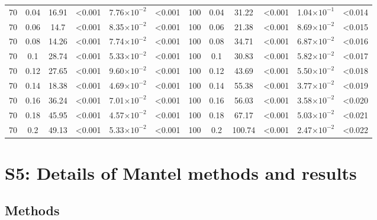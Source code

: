 \documentclass[12pt]{article}
\begin{document}
\begin{spacing}{2.0}
\begin{table}[hb!]
\begin{tabular}{c c | c c| c c ||c c | c c | c c |}
            70  & 0.04  & 16.91 & \textless0.001  & 7.76$\times10^{-2}$ & \textless0.001  & 100 & 0.04  & 31.22 & \textless0.001  & 1.04$\times10^{-1}$ & \textless0.014  \\
            70  & 0.06  & 14.7  & \textless0.001  & 8.35$\times10^{-2}$ & \textless0.001  & 100 & 0.06  & 21.38 & \textless0.001  & 8.69$\times10^{-2}$ & \textless0.015  \\
            70  & 0.08  & 14.26 & \textless0.001  & 7.74$\times10^{-2}$ & \textless0.001  & 100 & 0.08  & 34.71 & \textless0.001  & 6.87$\times10^{-2}$ & \textless0.016  \\
            70  & 0.1 & 28.74 & \textless0.001  & 5.33$\times10^{-2}$ & \textless0.001  & 100 & 0.1 & 30.83 & \textless0.001  & 5.82$\times10^{-2}$ & \textless0.017  \\
            70  & 0.12  & 27.65 & \textless0.001  & 9.60$\times10^{-2}$ & \textless0.001  & 100 & 0.12  & 43.69 & \textless0.001  & 5.50$\times10^{-2}$ & \textless0.018  \\
            70  & 0.14  & 18.38 & \textless0.001  & 4.69$\times10^{-2}$ & \textless0.001  & 100 & 0.14  & 55.38 & \textless0.001  & 3.77$\times10^{-2}$ & \textless0.019  \\
            70  & 0.16  & 36.24 & \textless0.001  & 7.01$\times10^{-2}$ & \textless0.001  & 100 & 0.16  & 56.03 & \textless0.001  & 3.58$\times10^{-2}$ & \textless0.020  \\
            70  & 0.18  & 45.95 & \textless0.001  & 4.57$\times10^{-2}$ & \textless0.001  & 100 & 0.18  & 67.17 & \textless0.001  & 5.03$\times10^{-2}$ & \textless0.021  \\
            70  & 0.2 & 49.13 & \textless0.001  & 5.33$\times10^{-2}$ & \textless0.001  & 100 & 0.2 & 100.74  & \textless0.001  & 2.47$\times10^{-2}$ & \textless0.022  \\
        \hline
	    \end{tabular}
	    \end{table}


\clearpage

\section*{S5: Details of Mantel methods and results}

	\subsection*{Methods}


\end{spacing}
\end{document}
